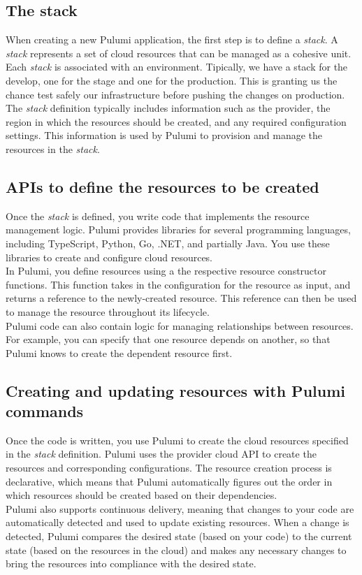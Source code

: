 \subsection{The stack}
When creating a new Pulumi application, the first step is to define a \textit{stack}.
A \textit{stack} represents a set of cloud resources that can be managed as a cohesive unit.\\
Each \textit{stack} is associated with an environment.
Tipically, we have a stack for the develop, one for the stage and one for the production.
This is granting us the chance test safely our infrastructure before pushing the changes on production.\\
The \textit{stack} definition typically includes information such as the provider, the region in which the resources should be created, and any required configuration settings.
This information is used by Pulumi to provision and manage the resources in the \textit{stack}.

\subsection{APIs to define the resources to be created}
Once the \textit{stack} is defined, you write code that implements the resource management logic.
Pulumi provides libraries for several programming languages, including TypeScript, Python, Go, .NET, and partially Java.
You use these libraries to create and configure cloud resources.\\
In Pulumi, you define resources using a the respective resource constructor functions.
This function takes in the configuration for the resource as input, and returns a reference to the newly-created resource.
This reference can then be used to manage the resource throughout its lifecycle.\\
Pulumi code can also contain logic for managing relationships between resources.
For example, you can specify that one resource depends on another, so that Pulumi knows to create the dependent resource first.

\subsection{Creating and updating resources with Pulumi commands}
Once the code is written, you use Pulumi to create the cloud resources specified in the \textit{stack} definition.
Pulumi uses the provider cloud API to create the resources and corresponding configurations. 
The resource creation process is declarative, which means that Pulumi automatically figures out the order in which resources should be created based on their dependencies.\\
Pulumi also supports continuous delivery, meaning that changes to your code are automatically detected and used to update existing resources.
When a change is detected, Pulumi compares the desired state (based on your code) to the current state (based on the resources in the cloud) and makes any necessary changes to bring the resources into compliance with the desired state.

